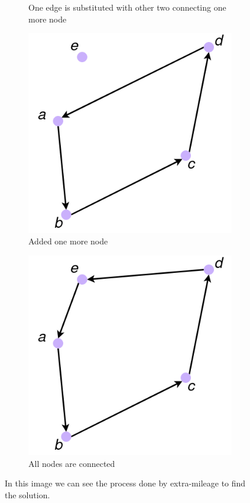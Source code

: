 \begin{figure}
\begin{subfigure}[b]{0.3\textwidth}
		\caption{One edge is substituted with other two connecting one more node}
	\end{subfigure}
	\bigskip
	\begin{subfigure}{0.3\textwidth}
		\centering
		\includegraphics[width=\textwidth]{images/extra_4}
		\caption{Added one more node}
	\end{subfigure}
	\hfill
	\begin{subfigure}{0.3\textwidth}
		\centering
		\includegraphics[width=\textwidth]{images/extra_5}
		\caption{All nodes are connected}
	\end{subfigure}
	\caption{In this image we can see the process done by extra-mileage to find the solution.}
	\label{fig:extra}
\end{figure}

